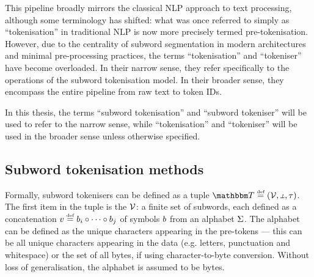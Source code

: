 This pipeline broadly mirrors the classical NLP approach to text processing, although some terminology has shifted: what was once referred to simply as “tokenisation” in traditional NLP is now more precisely termed pre-tokenisation. However, due to the centrality of subword segmentation in modern architectures and minimal pre-processing practices, the terms “tokenisation” and “tokeniser” have become overloaded. In their narrow sense, they refer specifically to the operations of the subword tokenisation model. In their broader sense, they encompass the entire pipeline from raw text to token IDs.

In this thesis, the terms “subword tokenisation” and “subword tokeniser” will be used to refer to the narrow sense, while “tokenisation” and “tokeniser” will be used in the broader sense unless otherwise specified.



\subsection{Subword tokenisation methods}

Formally, subword tokenisers can be defined as a tuple $\tokeniser \defeq (\vocab, \detok, \tok)$. The first item in the tuple is the  $\mathcal{V}$: a finite set of subwords, each defined as a concatenation $v \mathrel{\stackrel{\textnormal{\tiny def}}{=}} b_i \circ \cdots \circ b_j$ of symbols $b$ from an alphabet $\Sigma$. The alphabet can be defined as the unique characters appearing in the pre-tokens --- this can be all unique characters appearing in the data (e.g. letters, punctuation and whitespace) or the set of all bytes, if using character-to-byte conversion. Without loss of generalisation, the alphabet is assumed to be bytes.


